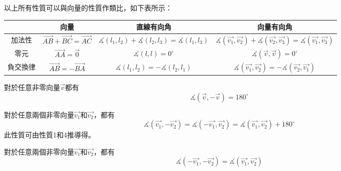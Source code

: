 \documentclass[12pt]{article}
\begin{document}
以上所有性質可以與向量的性質作類比，如下表所示：
\begin{table}[H]
    \centering
    \begin{tabular}{|c|c|c|c|}
        \hline
        &向量&直線有向角&向量有向角\\
        \hline
        加法性&$\overrightarrow{AB}+\overrightarrow{BC}=\overrightarrow{AC}$
        &$\measuredangle{\left(l_1,l_2\right)}+\measuredangle{\left(l_2,l_3\right)}=\measuredangle{\left(l_1,l_3\right)}$
        &$\measuredangle{\left(\overrightarrow{v_1},\overrightarrow{v_2}\right)}+\measuredangle{\left(\overrightarrow{v_2},\overrightarrow{v_3}\right)}
        =\measuredangle{\left(\overrightarrow{v_1},\overrightarrow{v_3}\right)}$\\
        \hline
        零元&$\overrightarrow{AA}=\overrightarrow{0}$&$\measuredangle{\left(l,l\right)}=0^{\circ}$
        &$\measuredangle{\left(\overrightarrow{v},\overrightarrow{v}\right)}=0^{\circ}$\\
        \hline
        負交換律&$\overrightarrow{AB}=-\overrightarrow{BA}$&$\measuredangle{\left(l_1,l_2\right)}=-\measuredangle{\left(l_2,l_1\right)}$
        &$\measuredangle{\left(\overrightarrow{v_1},\overrightarrow{v_2}\right)}=-\measuredangle{\left(\overrightarrow{v_2},\overrightarrow{v_1}\right)}$\\
        \hline
    \end{tabular}
\end{table}
\begin{mybox}[性質4]{4.5em}{1em}{0.5em}
    對於任意非零向量$\overrightarrow{v}$都有
    $$
        \measuredangle{\left(\overrightarrow{v},-\overrightarrow{v}\right)}=180^{\circ}
    $$
\end{mybox}
\begin{mybox}[性質5]{4.5em}{1em}{0.5em}
    對於任意兩個非零向量$\overrightarrow{v_1}$和$\overrightarrow{v_2}$，都有
    $$
        \measuredangle{\left(\overrightarrow{v_1},-\overrightarrow{v_2}\right)}
        =\measuredangle{\left(-\overrightarrow{v_1},\overrightarrow{v_2}\right)}
        =\measuredangle{\left(\overrightarrow{v_1},\overrightarrow{v_2}\right)}+180^{\circ}
    $$
    此性質可由性質1和4推導得。
\end{mybox}
\begin{mybox}[性質6]{4.5em}{1em}{0.5em}
    對於任意兩個非零向量$\overrightarrow{v_1}$和$\overrightarrow{v_2}$，都有
    $$
        \measuredangle{\left(-\overrightarrow{v_1},-\overrightarrow{v_2}\right)}
        =\measuredangle{\left(\overrightarrow{v_1},\overrightarrow{v_2}\right)}
    $$
\end{mybox}
\end{document}

